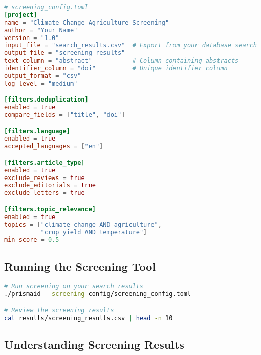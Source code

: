 \begin{configbox}
\begin{lstlisting}[language=TOML]
# screening_config.toml
[project]
name = "Climate Change Agriculture Screening"
author = "Your Name"
version = "1.0"
input_file = "search_results.csv"  # Export from your database search
output_file = "screening_results"
text_column = "abstract"           # Column containing abstracts
identifier_column = "doi"          # Unique identifier column
output_format = "csv"
log_level = "medium"

[filters.deduplication]
enabled = true
compare_fields = ["title", "doi"]

[filters.language]
enabled = true
accepted_languages = ["en"]

[filters.article_type]
enabled = true
exclude_reviews = true
exclude_editorials = true
exclude_letters = true

[filters.topic_relevance]
enabled = true
topics = ["climate change AND agriculture",
          "crop yield AND temperature"]
min_score = 0.5
\end{lstlisting}
\end{configbox}

\subsection{Running the Screening Tool}

\begin{commandbox}
\begin{lstlisting}[language=Bash]
# Run screening on your search results
./prismaid --screening config/screening_config.toml

# Review the screening results
cat results/screening_results.csv | head -n 10
\end{lstlisting}
\end{commandbox}



\subsection{Understanding Screening Results}

